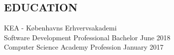 \documentclass[margin, 10pt, hidelinks]{res} %
\newcommand{\tab}{\hspace*{1em}} %
\newcommand{\emphasize}{\large} %
\begin{document}
\begin{resume}
\section{EDUCATION}

KEA - Københavns Erhvervsakademi 	\\
{\emphasize Software Development}  Professional Bachelor   \hfill  June 2018\\
{\emphasize Computer Science}  Academy Profession  \hfill  January 2017 \\









\end{resume}
\end{document}
